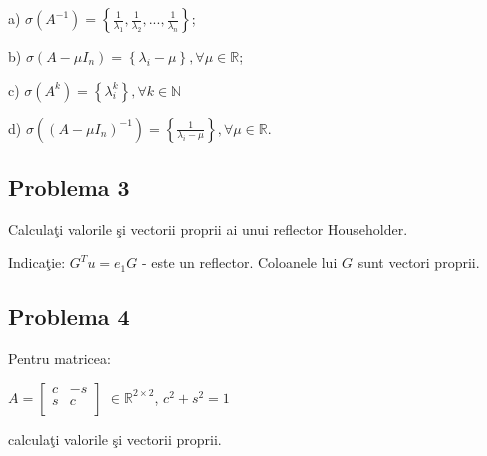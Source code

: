 \documentclass{exam}
\begin{document}
a) $\sigma(A^{-1}) = \left\lbrace \frac{1}{\lambda _{1}}, \frac{1}{\lambda _{2}}, ..., \frac{1}{\lambda _{n}}\right\rbrace $;

b) $\sigma(A - \mu I_{n}) = \left\lbrace \lambda_{i} - \mu \right\rbrace , \forall \mu \in \mathbb{R}$;

c) $\sigma(A^{k}) = \left\lbrace \lambda_{i}^{k} \right\rbrace , \forall k \in \mathbb{N}$

d) $\sigma((A - \mu I_{n})^{- 1}) = \left\lbrace \frac{1}{\lambda_{i} - \mu} \right\rbrace , \forall \mu \in \mathbb{R}$.



\subsection{Problema 3}
Calculaţi valorile şi vectorii proprii ai unui reflector Householder.

Indicaţie: $G^{T} u = e_{1}G$  - este un reflector. Coloanele lui $G$ sunt vectori proprii.



\subsection{Problema 4}
Pentru matricea:
\begin{center}
	$A = \begin{bmatrix}
			c & -s \\
			s & c  \\
		\end{bmatrix}$
	$\in \mathbb{R}^{2 \times 2}$, $c^2+s^2=1$
\end{center}

calculaţi valorile şi vectorii proprii.

\end{document}
